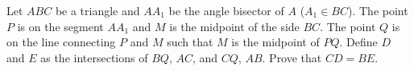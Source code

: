 Let $ABC$ be a triangle and $AA_1$ be the angle bisector of $A$ ($A_1 \in BC$). The point $P$ is on the segment $AA_1$ and $M$ is the midpoint of the side $BC$. The point $Q$ is on the line connecting $P$ and $M$ such that $M$ is the midpoint of $PQ$. Define $D$ and $E$ as the intersections of $BQ$,  $AC$,  and $CQ$,  $AB$. Prove that $CD=BE$.